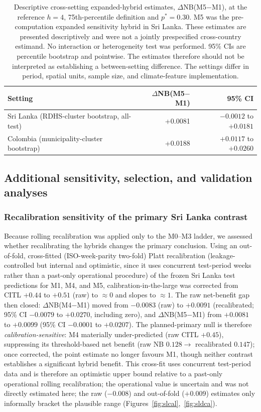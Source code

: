 \documentclass[11pt,a4paper]{article}
\begin{document}
\begin{table}[htbp]
\centering
\caption{Descriptive cross-setting expanded-hybrid estimates, $\Delta$NB(M5$-$M1), at the reference $h=4$, 75th-percentile definition and $p^*=0.30$. M5 was the pre-computation expanded sensitivity hybrid in Sri Lanka. These estimates are presented descriptively and were not a jointly prespecified cross-country estimand. No interaction or heterogeneity test was performed. 95\% CIs are percentile bootstrap and pointwise. The estimates therefore should not be interpreted as establishing a between-setting difference. The settings differ in period, spatial units, sample size, and climate-feature implementation.}
\label{tab:crosssetting}
\small
\begin{tabular}{lrr}
\toprule
Setting & $\Delta$NB(M5$-$M1) & 95\% CI \\
\midrule
Sri Lanka (RDHS-cluster bootstrap, all-test) & +0.0081 & $-0.0012$ to $+0.0181$ \\
Colombia (municipality-cluster bootstrap) & +0.0188 & $+0.0117$ to $+0.0260$ \\
\bottomrule
\end{tabular}
\end{table}

\subsection{Additional sensitivity, selection, and validation analyses}

\subsubsection*{Recalibration sensitivity of the primary Sri Lanka contrast}
Because rolling recalibration was applied only to the M0--M3 ladder, we assessed whether recalibrating the hybrids changes the primary conclusion. Using an out-of-fold, cross-fitted (ISO-week-parity two-fold) Platt recalibration (leakage-controlled but internal and optimistic, since it uses concurrent test-period weeks rather than a past-only operational procedure) of the frozen Sri Lanka test predictions for M1, M4, and M5, calibration-in-the-large was corrected from CITL $+0.44$ to $+0.51$ (raw) to $\approx0$ and slopes to $\approx1$. The raw net-benefit gap then closed: $\Delta$NB(M4$-$M1) moved from $-0.0083$ (raw) to $+0.0091$ (recalibrated; 95\% CI $-0.0079$ to $+0.0270$, including zero), and $\Delta$NB(M5$-$M1) from $+0.0081$ to $+0.0099$ (95\% CI $-0.0001$ to $+0.0207$). The planned-primary null is therefore \emph{calibration-sensitive}: M4 materially under-predicted (raw CITL $+0.45$), suppressing its threshold-based net benefit (raw NB $0.128\to$ recalibrated $0.147$); once corrected, the point estimate no longer favours M1, though neither contrast establishes a significant hybrid benefit. This cross-fit uses concurrent test-period data and is therefore an optimistic upper bound relative to a past-only operational rolling recalibration; the operational value is uncertain and was not directly estimated here; the raw ($-0.008$) and out-of-fold ($+0.009$) estimates only informally bracket the plausible range (Figures~\ref{fig:slcal},~\ref{fig:sldca}).
\end{document}
